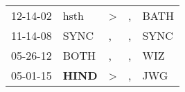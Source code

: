 \begin{supertabular}{p{0.07\textwidth}p{0.06\textwidth}p{0.02\textwidth}p{0.02\textwidth}p{0.06\textwidth}}
          12-14-02\textsuperscript{} &           hsth\textsuperscript{} &  \textgreater &             , &          BATH\textsuperscript{} \\
          11-14-08\textsuperscript{} &           SYNC\textsuperscript{} &             , &             , &          SYNC\textsuperscript{} \\
          05-26-12\textsuperscript{} &           BOTH\textsuperscript{} &             , &             , &           WIZ\textsuperscript{} \\
          05-01-15\textsuperscript{} &  \textbf{HIND\textsuperscript{}} &  \textgreater &             , &           JWG\textsuperscript{} \\
\end{supertabular}
